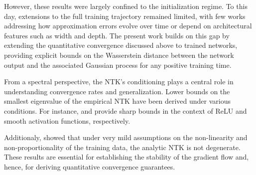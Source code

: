\documentclass{article}
\theoremstyle{definition}
\theoremstyle{remark}
\numberwithin{equation}{section}
\begin{document}
However, these results were largely confined to the initialization regime. 
To this day, extensions to the full training trajectory remained limited, with few works addressing how approximation errors evolve over time or depend on architectural features such as width and depth. 
The present work builds on this gap by extending the quantitative convergence discussed above to trained networks, providing explicit bounds on the Wasserstein distance between the network output and the associated Gaussian process for any positive training time.

From a spectral perspective, the NTK's conditioning plays a central role in understanding convergence rates and generalization. 
Lower bounds on the smallest eigenvalue of the empirical NTK have been derived under various conditions. 
For instance, \cite{montufar} and \cite{bombari2022memorization} provide sharp bounds in the context of ReLU and smooth activation functions, respectively. 

Additionaly, \cite{carvalho2024} showed that under very mild assumptions on the non-linearity and non-proportionality of the training data, the analytic NTK is not degenerate.
These results are essential for establishing the stability of the gradient flow and, hence, for deriving quantitative convergence guarantees.


\end{document}
